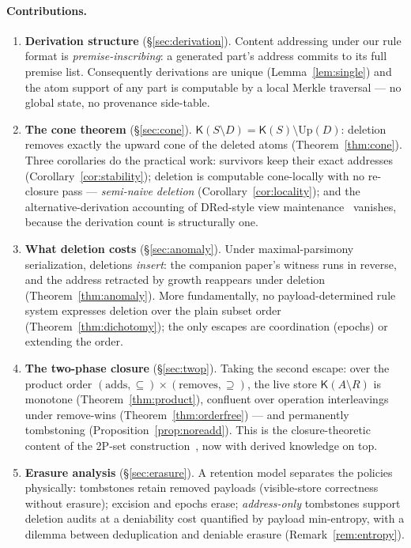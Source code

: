 \documentclass[11pt]{article}
\theoremstyle{definition}
\theoremstyle{remark}
\newcommand{\K}{\mathsf{K}}
\newcommand{\Up}{\mathrm{Up}}
\newcommand{\diffop}{\setminus}
\newcommand{\sub}{\subseteq}
\begin{document}
\paragraph{Contributions.}
\begin{enumerate}[leftmargin=1.4em, itemsep=1pt]
\item \textbf{Derivation structure} (\S\ref{sec:derivation}). Content addressing under our rule format is \emph{premise-inscribing}: a generated part's address commits to its full premise list. Consequently derivations are unique (Lemma~\ref{lem:single}) and the atom support of any part is computable by a local Merkle traversal --- no global state, no provenance side-table.
\item \textbf{The cone theorem} (\S\ref{sec:cone}). $\K(S \diffop D) = \K(S) \setminus \Up(D)$: deletion removes exactly the upward cone of the deleted atoms (Theorem~\ref{thm:cone}). Three corollaries do the practical work: survivors keep their exact addresses (Corollary~\ref{cor:stability}); deletion is computable cone-locally with no re-closure pass --- \emph{semi-naive deletion} (Corollary~\ref{cor:locality}); and the alternative-derivation accounting of DRed-style view maintenance~\cite{GuptaMS93} vanishes, because the derivation count is structurally one.
\item \textbf{What deletion costs} (\S\ref{sec:anomaly}). Under maximal-parsimony serialization, deletions \emph{insert}: the companion paper's witness runs in reverse, and the address retracted by growth reappears under deletion (Theorem~\ref{thm:anomaly}). More fundamentally, no payload-determined rule system expresses deletion over the plain subset order (Theorem~\ref{thm:dichotomy}); the only escapes are coordination (epochs) or extending the order.
\item \textbf{The two-phase closure} (\S\ref{sec:twop}). Taking the second escape: over the product order $(\text{adds},\sub)\times(\text{removes},\supseteq)$, the live store $\K(A \diffop R)$ is monotone (Theorem~\ref{thm:product}), confluent over operation interleavings under remove-wins (Theorem~\ref{thm:orderfree}) --- and permanently tombstoning (Proposition~\ref{prop:noreadd}). This is the closure-theoretic content of the 2P-set construction~\cite{Shapiro11}, now with derived knowledge on top.
\item \textbf{Erasure analysis} (\S\ref{sec:erasure}). A retention model separates the policies physically: tombstones retain removed payloads (visible-store correctness without erasure); excision and epochs erase; \emph{address-only} tombstones support deletion audits at a deniability cost quantified by payload min-entropy, with a dilemma between deduplication and deniable erasure (Remark~\ref{rem:entropy}).

\end{enumerate}
\end{document}
